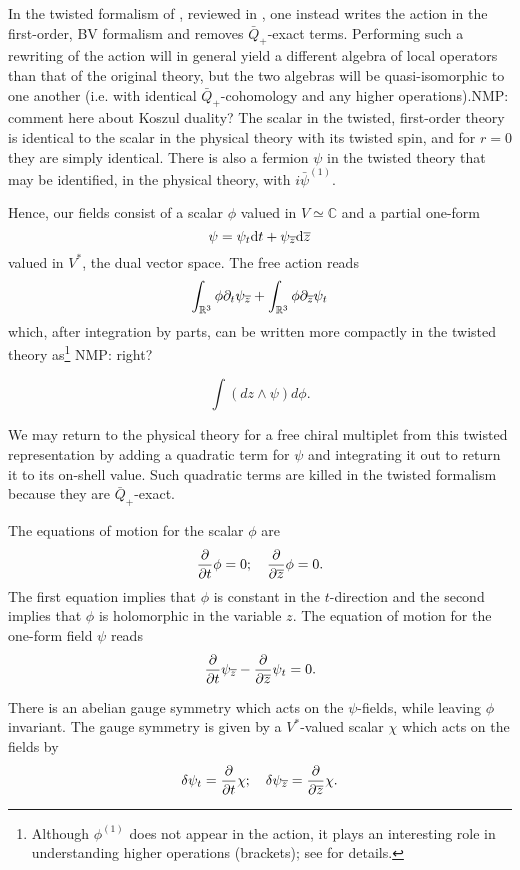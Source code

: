\documentclass[11pt]{amsart}
\def\natalie#1{{\textcolor{green!65!black}{NMP: {#1}}}}
\begin{document}
In the twisted formalism of \cite{ACNV}, reviewed in \cite{CDG}, one instead writes the action in the first-order, BV formalism and removes $\bar{Q}_+$-exact terms. Performing such a rewriting of the action will in general yield a different algebra of local operators than that of the original theory, but the two algebras will be quasi-isomorphic to one another (i.e. with identical $\bar{Q}_+$-cohomology and any higher operations).\natalie{comment here about Koszul duality?}
The scalar in the twisted, first-order theory is identical to the scalar in the physical theory with its twisted spin, and for $r=0$ they are simply identical. There is also a fermion $\psi$ in the twisted theory that may be identified, in the physical theory, with $i \bar{\psi}^{(1)}$.

Hence, our fields consist of a scalar $\phi$ valued in $V \simeq \mathbb{C}$ and a partial one-form 
\[
\psi = \psi_t {\rm d} t + \psi_{\overline{z}} {\rm d} {\overline{z}} 
\]
valued in $V^*$, the dual vector space.
The free action reads
\[
\int_{\mathbb R^3} \phi \partial_t \psi_{\overline{z}} + \int_{\mathbb R^3} \phi \partial_{\overline{z}} \psi_t 
\]
which, after integration by parts, can be written more compactly in the twisted theory as\footnote{Although $\phi^{(1)}$ does not appear in the action, it plays an interesting role in understanding higher operations (brackets); see \cite{CDG} for details.} \natalie{right?}

\[
\int(dz \wedge \psi) d\phi.
\]

We may return to the physical theory for a free chiral multiplet from this twisted representation by adding a quadratic term for $\psi$ and integrating it out to return it to its on-shell value. Such quadratic terms are killed in the twisted formalism because they are $\bar{Q}_+$-exact.  

The equations of motion for the scalar $\phi$ are
\[
\frac{\partial}{\partial t} \phi = 0; \quad
\frac{\partial}{\partial {\overline{z}}} \phi = 0 .
\]
The first equation implies that $\phi$ is constant in the $t$-direction and the second implies that $\phi$ is holomorphic in the variable $z$. 
The equation of motion for the one-form field $\psi$ reads
\[
\frac{\partial}{\partial t} \psi_{\overline{z}} - \frac{\partial}{\partial {\overline{z}}} \psi_t = 0 .
\]

There is an abelian gauge symmetry which acts on the $\psi$-fields, while leaving $\phi$ invariant.
The gauge symmetry is given by a $V^*$-valued scalar $\chi$ which acts on the fields by
\begin{equation}\label{eqn:freegauge}
\delta \psi_t = \frac{\partial}{\partial t} \chi; \quad
\delta \psi_{\overline{z}} = \frac{\partial}{\partial {\overline{z}}} \chi .
\end{equation}
\end{document}
